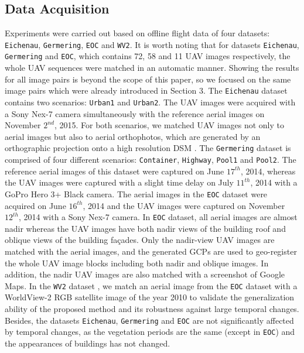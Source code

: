 \subsection{Data Acquisition}
\label{ssec:data}
Experiments were carried out based on offline flight data of four datasets:  \texttt{Eichenau}, \texttt{Germering}, \texttt{EOC} and \texttt{WV2}. 
It is worth noting that for datasets \texttt{Eichenau}, \texttt{Germering} and \texttt{EOC}, which contains 72, 58 and 11 UAV images respectively, the whole UAV sequences were matched in an automatic manner.
Showing the results for all image pairs is beyond the scope of this paper, so we focused on the same image pairs which were already introduced in Section 3.
The \texttt{Eichenau} dataset contains two scenarios: \texttt{Urban1} and \texttt{Urban2}.
The UAV images were acquired with a Sony Nex-7 camera simultaneously with the reference aerial images on November $2^{nd}$, 2015. 
For both scenarios, we matched UAV images not only to aerial images but also to aerial orthophotos, which are generated by an orthographic projection onto a high resolution DSM \cite{hirschmuller2008stereo,d2011semiglobal}.
The \texttt{Germering} dataset is comprised of four different scenarios: \texttt{Container}, \texttt{Highway}, \texttt{Pool1} and \texttt{Pool2}.
The reference aerial images of this dataset were captured on June $17^{th}$, 2014, whereas the UAV images were captured with a slight time delay on July $11^{th}$, 2014 with a GoPro Hero 3+ Black camera.
The aerial images in the \texttt{EOC} dataset were acquired on June $16^{th}$, 2014 and the UAV images were captured on November $12^{th}$, 2014 with a Sony Nex-7 camera.
In \texttt{EOC} dataset, all aerial images are almost nadir whereas the UAV images have both nadir views of the building roof and oblique views of the building fa\c{c}ades. Only the nadir-view UAV images are matched with the aerial images, and the generated GCPs are used to geo-register the whole UAV image blocks including both nadir and oblique images. In addition, the nadir UAV images are also matched with a screenshot of Google Maps.
In the \texttt{WV2} dataset \cite{Koch_2016_CVPR_Workshops}, we match an aerial image from the \texttt{EOC} dataset with a WorldView-2 RGB satellite image of the year 2010 to validate the generalization ability of the proposed method and its robustness against large temporal changes.
Besides, the datasets \texttt{Eichenau}, \texttt{Germering} and \texttt{EOC} are not significantly affected by temporal changes, as the vegetation periods are the same (except in \texttt{EOC}) and the appearances of buildings has not changed.
